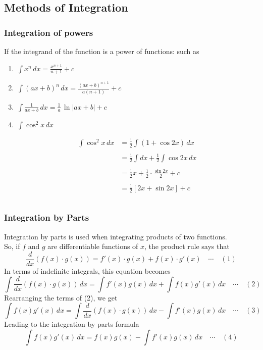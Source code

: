 \documentclass[11pt,a4paper]{article}
\theoremstyle{definition}
\begin{document}
\subsection{Methods of Integration}

\subsubsection{Integration of powers}
If the integrand of the function is a power of functions: such as 
\begin{enumerate}
\item $\, \displaystyle{\int x^n\, dx  = \frac{x^{n + 1}}{n + 1} + c}$\\

\item $\,\displaystyle{\int \left(ax + b\right)^n  \,dx = \frac{\left(ax + b\right)^{n +1}}{a(n+ 1)} + c}$\\

\item $\,\displaystyle{\int \frac{1}{ax + b}\,dx = \frac{1}{a}\,\ln\left|ax + b\right| + c}$\\

\item $\,\displaystyle{\int \cos^2x\,dx}$


\begin{align*}
\int \cos^2x\,dx & = \frac{1}{2}\int \left(1 + \cos 2x\right)\,dx\\\\
& = \frac{1}{2}\int dx + \frac{1}{2}\int \cos 2x\,dx\\\\
&  = \frac{1}{2}x  + \frac{1}{2}\cdot \frac{\sin 2x}{2} + c\\\\
& = \frac{1}{2}\left[2x + \sin 2x\right] + c\\\\
\end{align*}
\end{enumerate}









\subsubsection{Integration by Parts}
Integration by parts is used when integrating products of two functions.\\
So, if $f$ and $g$ are differentiable functions of $x$, the product rule says that
$$\frac{d}{dx}\left(f(x)\cdot g(x)\right) = f'(x)\cdot g(x) + f(x)\cdot g'(x)\quad  \cdots\quad  (1)$$
In terms of indefinite integrals, this equation becomes 
$$\int\frac{d}{dx}\left(f(x)\cdot g(x)\right)\,dx = \int f'(x)g(x)\,dx + \int f(x) g'(x)\,dx \quad  \cdots\quad  (2)$$
Rearranging the terms of (2), we get 
$$\int f(x) g'(x)\,dx = \int\frac{d}{dx}\left(f(x)\cdot g(x)\right)\,dx- \int f'(x)g(x)\,dx  \quad  \cdots\quad  (3)$$
Leading to the integration by parts formula
$$\int f(x) g'(x)\,dx = f(x)g(x)- \int f'(x)g(x)\,dx  \quad  \cdots\quad  (4)$$
\end{document}
